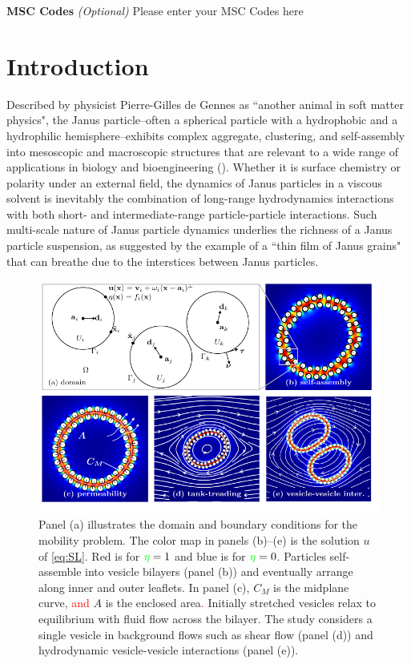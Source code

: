 \documentclass[lineno]{jfm}
\newcommand{\ReviewerOne}[1]{\textcolor{red}{#1}}
\newcommand{\ReviewerTwo}[1]{\textcolor{green}{#1}}
\begin{document}
{\bf MSC Codes }  {\it(Optional)} Please enter your MSC Codes here



\section{\label{intro}Introduction}
Described by physicist Pierre-Gilles de Gennes as ``another animal in soft matter physics", the
Janus particle--often a spherical particle with a hydrophobic and a
hydrophilic hemisphere--exhibits complex aggregate, clustering, and
self-assembly into mesoscopic and macroscopic structures that are
relevant to a wide range of applications in biology and bioengineering (\cite{deGennes1991}).
Whether it is surface chemistry or polarity under an external field, the
dynamics of Janus particles in a viscous solvent is inevitably the combination of long-range
hydrodynamics interactions with both short- and intermediate-range 
particle-particle interactions. Such multi-scale nature of Janus particle dynamics underlies 
the richness of a Janus particle suspension, as \cite{deGennes1991} suggested by the example of 
a ``thin film of Janus grains" that can breathe due to the interstices between Janus particles.

\begin{figure}
\begin{center}
\includegraphics[width=\textwidth]{Figure0_Wrapper.pdf}
\end{center}
\caption{Panel (a) illustrates the domain and boundary conditions for
  the mobility problem. The color map in panels (b)--(e) is the solution
  $u$ of \eqref{eq:SL}. Red is for $\ReviewerTwo{\eta} = 1$ and blue is for $\ReviewerTwo{\eta} = 0$.
  Particles self-assemble into vesicle bilayers (panel (b)) and
  eventually arrange along inner and outer leaflets. In panel (c), $C_M$
  is the midplane curve, \ReviewerOne{and} $A$ is the enclosed area\ReviewerOne{.}
  Initially stretched vesicles relax to equilibrium with fluid
  flow across the bilayer. The study considers a single vesicle in
  background flows such as shear flow (panel (d)) and hydrodynamic
  vesicle-vesicle interactions (panel (e)).}
\label{fig:figure0}
\end{figure}
\end{document}

